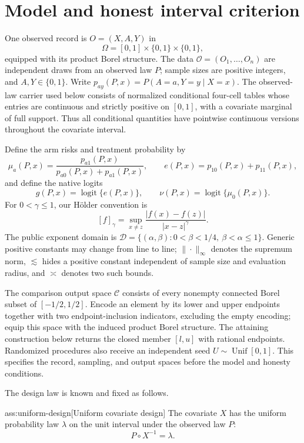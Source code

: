 \documentclass[11pt]{article}
\begin{document}
\section{Model and honest interval criterion}

One observed record is \(O=(X,A,Y)\) in
\[
\Omega=[0,1]\times\{0,1\}\times\{0,1\},
\]
equipped with its product Borel structure. The data
\(\mathcal O=(O_1,\ldots,O_n)\) are independent draws from an observed law
\(P\); sample sizes are positive integers, and \(A,Y\in\{0,1\}\). Write
\(p_{ay}(P,x)=P(A=a,Y=y\mid X=x)\). The observed-law carrier used below
consists of normalized conditional four-cell tables whose entries are
continuous and strictly positive on \([0,1]\), with a covariate marginal of
full support. Thus all conditional quantities have pointwise continuous
versions throughout the covariate interval.

Define the arm risks and treatment probability by
\[
\mu_a(P,x)=\frac{p_{a1}(P,x)}{p_{a0}(P,x)+p_{a1}(P,x)},
\qquad
e(P,x)=p_{10}(P,x)+p_{11}(P,x),
\]
and define the native logits
\[
g(P,x)=\operatorname{logit}\{e(P,x)\},
\qquad
\nu(P,x)=\operatorname{logit}\{\mu_0(P,x)\}.
\]
For \(0<\gamma\le1\), our Hölder convention is
\[
[f]_\gamma=\sup_{x\ne z}\frac{|f(x)-f(z)|}{|x-z|^\gamma}.
\]
The public exponent domain is
\(\mathcal D=\{(\alpha,\beta):0<\beta<1/4,\ \beta<\alpha\le1\}\).
Generic positive constants may change from line to line; \(\|\cdot\|_\infty\)
denotes the supremum norm, \(\lesssim\) hides a positive constant independent
of sample size and evaluation radius, and \(\asymp\) denotes two such bounds.

The comparison output space \(\mathcal C\) consists of every nonempty connected
Borel subset of \([-1/2,1/2]\). Encode an element by its lower and upper
endpoints together with two endpoint-inclusion indicators, excluding the empty
encoding; equip this space with the induced product Borel structure. The
attaining construction below returns the closed member \([l,u]\) with rational
endpoints. Randomized procedures also receive an independent seed
\(U\sim\operatorname{Unif}[0,1]\).
This specifies the record, sampling, and output spaces before the model and
honesty conditions.

The design law is known and fixed as follows.

\begin{assumptionv}{ass:uniform-design}[Uniform covariate design]
The covariate \(X\) has the uniform probability law \(\lambda\) on the unit interval under the observed law \(P\):
\[
P\circ X^{-1}=\lambda.
\]
\end{assumptionv}
\end{document}
